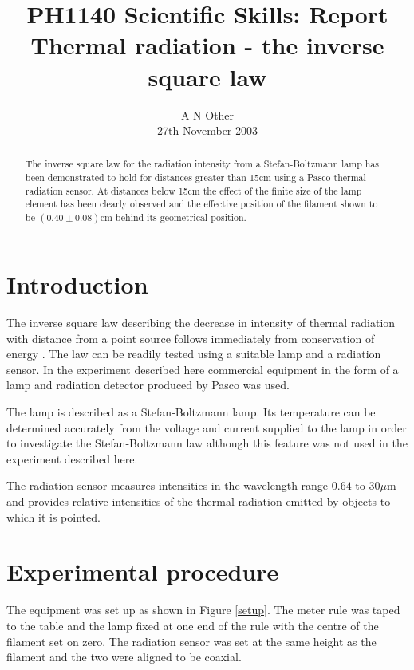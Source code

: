 \documentclass[10pt]{iopart}
\begin{document}
\title[PH1140 Report - A N Other]{PH1140 Scientific Skills: Report
\\Thermal radiation - the inverse square law}

\author{A N Other\\27th November 2003}

\begin{abstract}
The inverse square law for the radiation intensity from a
Stefan-Boltzmann lamp has been demonstrated to hold for distances
greater than 15cm using a Pasco thermal radiation sensor. At
distances below 15cm the effect of the finite size of the lamp
element has been clearly observed and the effective position of
the filament shown to be $(0.40 \pm  0.08)$cm behind its
geometrical position.
\end{abstract}


\section{Introduction}

The inverse square law describing the decrease in intensity of
thermal radiation with distance from a point source follows
immediately from conservation of energy \cite{yandf,nave}. The law
can be readily tested using a suitable lamp and a radiation
sensor. In the experiment described here commercial equipment in
the form of a lamp and radiation detector produced by Pasco
\cite{pasco} was used.

The lamp is described as a Stefan-Boltzmann lamp. Its temperature
can be determined accurately from the voltage and current supplied
to the lamp in order to investigate the Stefan-Boltzmann law
although this feature was not used in the experiment described
here.

The radiation sensor measures intensities in the wavelength range
$0.64$ to $30\mu$m and provides relative intensities of the
thermal radiation emitted by objects to which it is pointed.

\section{Experimental procedure}

The equipment was set up as shown in Figure \ref{setup}. The meter
rule was taped to the table and the lamp fixed at one end of the
rule with the centre of the filament set on zero. The radiation
sensor was set at the same height as the filament and the two were
aligned to be coaxial.
\end{document}
